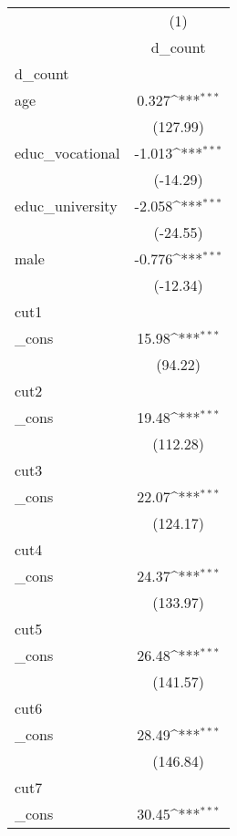 {
\def\sym#1{\ifmmode^{#1}\else\(^{#1}\)\fi}
\begin{tabular}{l*{1}{c}}
\hline\hline
            &\multicolumn{1}{c}{(1)}\\
            &\multicolumn{1}{c}{d\_count}\\
\hline
d\_count     &                     \\
age         &       0.327\sym{***}\\
            &    (127.99)         \\
[1em]
educ\_vocational&      -1.013\sym{***}\\
            &    (-14.29)         \\
[1em]
educ\_university&      -2.058\sym{***}\\
            &    (-24.55)         \\
[1em]
male        &      -0.776\sym{***}\\
            &    (-12.34)         \\
\hline
cut1        &                     \\
\_cons      &       15.98\sym{***}\\
            &     (94.22)         \\
\hline
cut2        &                     \\
\_cons      &       19.48\sym{***}\\
            &    (112.28)         \\
\hline
cut3        &                     \\
\_cons      &       22.07\sym{***}\\
            &    (124.17)         \\
\hline
cut4        &                     \\
\_cons      &       24.37\sym{***}\\
            &    (133.97)         \\
\hline
cut5        &                     \\
\_cons      &       26.48\sym{***}\\
            &    (141.57)         \\
\hline
cut6        &                     \\
\_cons      &       28.49\sym{***}\\
            &    (146.84)         \\
\hline
cut7        &                     \\
\_cons      &       30.45\sym{***}\\

\end{tabular}}
